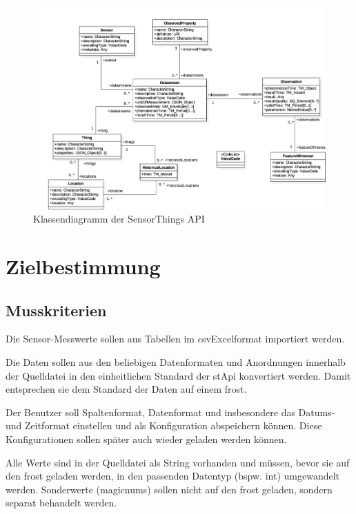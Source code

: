 \documentclass[a4paper, 12 pt]{article}
\begin{document}
\begin{figure}
\centering
\includegraphics[scale=0.8]{images/ogc}
\caption{\label{fig:ogc}Klassendiagramm der SensorThings API}
\end{figure}

\newpage
\section{Zielbestimmung}
	\subsection{Musskriterien}
	
	
	Die Sensor-Messwerte sollen aus Tabellen im \gls{csvExcel}format importiert werden.

	Die Daten sollen aus den beliebigen Datenformaten und Anordnungen innerhalb der Quelldatei in den einheitlichen Standard der \gls{stApi} konvertiert werden.
    Damit entsprechen sie dem Standard der Daten auf einem \gls{frost}.
	
	Der Benutzer soll Spaltenformat, Datenformat und insbesondere das Datums- und Zeitformat einstellen und als Konfiguration abspeichern können.
    Diese Konfigurationen sollen später auch wieder geladen werden können.

	Alle Werte sind in der Quelldatei als String vorhanden und müssen, bevor sie auf den \gls{frost} geladen werden, in den passenden Datentyp (bspw. \gls{int}) umgewandelt werden.
	Sonderwerte (\glspl{magicnum}) sollen nicht auf den \gls{frost} geladen, sondern separat behandelt werden.	
	
\end{document}
